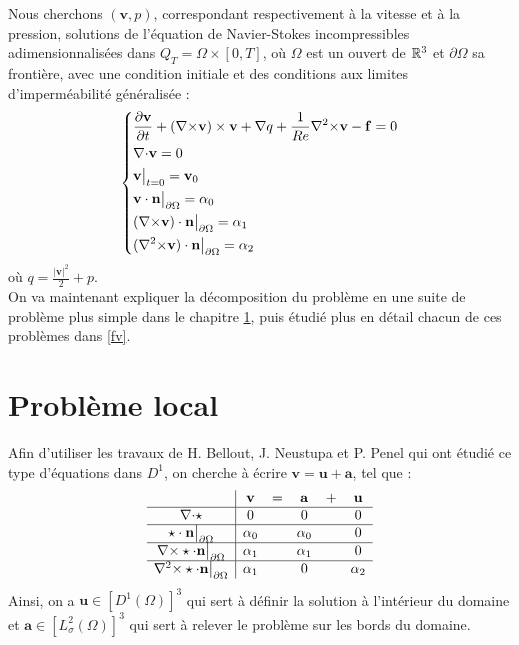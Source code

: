 Nous cherchons $(\mathbf{v},p)$, correspondant respectivement à la vitesse et à la pression, solutions de l'équation de Navier-Stokes incompressibles adimensionnalisées dans $Q_T=\Omega\times[0,T]$, où $\Omega$ est un ouvert de ${\mathbb{R}}^3$ et $\partial\Omega$ sa frontière, avec une condition initiale et des conditions aux limites d'imperméabilité généralisée :
\begin{equation}\label{depart}
\left\{\begin{aligned}
&\frac{\partial \mathbf{v}}{\partial t} + ({\nabla\times}  \mathbf{v})\times \mathbf{v} + {\nabla} q + \frac{1}{Re}{\nabla^2\times}  \mathbf{v}-\mathbf{f} = 0\\
&{\nabla\cdot} \mathbf{v} = 0\\
&\mathbf{v}\big\rvert_{t=0} = \mathbf{v}_0\\
&\mathbf{v}\cdot \mathbf{n}{\big\rvert_{\partial\Omega}} = \alpha_0\\
&({\nabla\times}  \mathbf{v})\cdot \mathbf{n}{\big\rvert_{\partial\Omega}} = \alpha_1\\
&({\nabla^2\times}  \mathbf{v})\cdot \mathbf{n}{\big\rvert_{\partial\Omega}} = \alpha_2
\end{aligned}\right.
\end{equation}
où $q = \frac{|\mathbf{v}|^2}{2}+p$.\\

On va maintenant expliquer la décomposition du problème en une suite de problème plus simple dans le chapitre \ref{local}, puis étudié plus en détail chacun de ces problèmes dans \ref{fv}.

\chapter{Problème local}
\label{local}

Afin d'utiliser les travaux de H. Bellout, J. Neustupa et P. Penel \cite{Penel2004} qui ont étudié ce type d'équations dans $D^1$, on cherche à écrire $\mathbf{v}=\mathbf{u}+\mathbf{a}$, tel que :\\
\begin{equation}\label{v}
\begin{array}{c|ccccc}
& \mathbf{v} & = & \mathbf{a} & + & \mathbf{u}\\ \hline
{\nabla\cdot}\star & 0 & & 0 & & 0\\ \hline
\star\cdot \mathbf{n}{\big\rvert_{\partial\Omega}} & \alpha_0 & & \alpha_0 & & 0\\ \hline
{\nabla\times}\star\cdot \mathbf{n}{\big\rvert_{\partial\Omega}} & \alpha_1 & & \alpha_1 & & 0\\ \hline
{\nabla^2\times}\star\cdot \mathbf{n}{\big\rvert_{\partial\Omega}} & \alpha_1 & & 0 & & \alpha_2
\end{array}
\end{equation}
Ainsi, on a $\mathbf{u}\in [D^1(\Omega)]^3$ qui sert à définir la solution à l'intérieur du domaine et $\mathbf{a}\in [L_\sigma^2(\Omega)]^3$ qui sert à relever le problème sur les bords du domaine.

